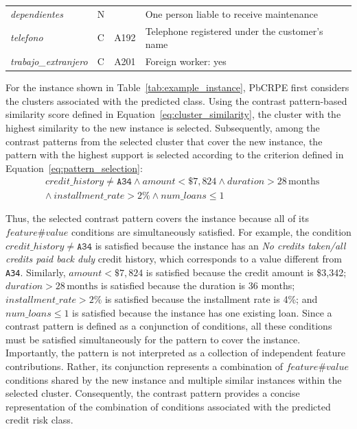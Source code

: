 {\begin{table}[H]
\begin{tabularx}{\textwidth}{
			>{\raggedright\arraybackslash}p{}
			>{\centering\arraybackslash}p{}
			>{\centering\arraybackslash}p{}
			X
		}
		\textit{dependientes} 
		& N 
		& 1 
		& One person liable to receive maintenance \\
		
		\textit{telefono} 
		& C 
		& A192 
		& Telephone registered under the customer's name \\
		
		\textit{trabajo\_extranjero} 
		& C 
		& A201 
		& Foreign worker: yes \\
		
		\bottomrule
	\end{tabularx}
\end{table}

For the instance shown in Table~\ref{tab:example_instance}, PbCRPE first considers the clusters associated with the predicted class. Using the contrast pattern-based similarity score defined in Equation~\ref{eq:cluster_similarity}, the cluster with the highest similarity to the new instance is selected. Subsequently, among the contrast patterns from the selected cluster that cover the new instance, the pattern with the highest support is selected according to the criterion defined in Equation~\ref{eq:pattern_selection}:
\[
\begin{aligned}
	&\mathit{credit\_history} \neq \texttt{A34} \wedge
	\mathit{amount} < \$7{,}824 \wedge
	\mathit{duration} > 28\,\mathrm{months} \\
	&\wedge\ 
	\mathit{installment\_rate} > 2\% \wedge
	\mathit{num\_loans} \leq 1
\end{aligned}
\]

Thus, the selected contrast pattern covers the instance because all of its $feature\#value$ conditions are simultaneously satisfied. For example, the condition $\mathit{credit\_history} \neq \texttt{A34}$ is satisfied because the instance has an \textit{No credits taken/all credits paid back duly} credit history, which corresponds to a value different from \texttt{A34}. Similarly, $\mathit{amount} < \$7{,}824$ is satisfied because the credit amount is \$3,342; $\mathit{duration} > 28\,\mathrm{months}$ is satisfied because the duration is 36 months; $\mathit{installment\_rate} > 2\%$ is satisfied because the installment rate is 4\%; and $\mathit{num\_loans} \leq 1$ is satisfied because the instance has one existing loan. Since a contrast pattern is defined as a conjunction of conditions, all these conditions must be satisfied simultaneously for the pattern to cover the instance. Importantly, the pattern is not interpreted as a collection of independent feature contributions. Rather, its conjunction represents a combination of $feature\#value$ conditions shared by the new instance and multiple similar instances within the selected cluster. Consequently, the contrast pattern provides a concise representation of the combination of conditions associated with the predicted credit risk class.\newline

}
